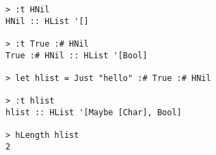 \begin{repl}\begin{lstlisting}
> :t HNil
HNil :: HList '[]

> :t True :# HNil
True :# HNil :: HList '[Bool]

> let hlist = Just "hello" :# True :# HNil

> :t hlist
hlist :: HList '[Maybe [Char], Bool]

> hLength hlist
2\end{lstlisting}\end{repl}
